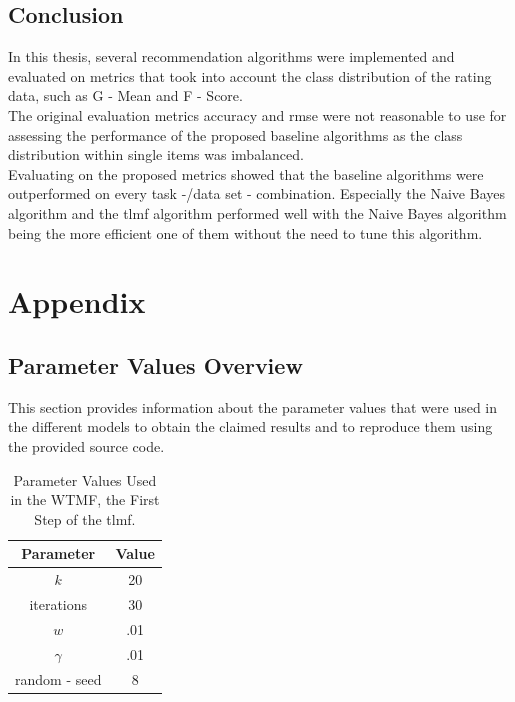 \subsection{Conclusion}
In this thesis, several recommendation algorithms were implemented and evaluated on metrics that took into account the class distribution of the rating data, such as G - Mean and F - Score.\\
The original evaluation metrics accuracy and rmse were not reasonable to use for assessing the performance of the proposed baseline algorithms as the class distribution within single items was imbalanced.\\
Evaluating on the proposed metrics showed that the baseline algorithms were outperformed on every task -/data set - combination. Especially the Naive Bayes algorithm and the \acrshort{tlmf} algorithm performed well with the Naive Bayes algorithm being the more efficient one of them without the need to tune this algorithm.
 
\clearpage
\section{Appendix}
\subsection{Parameter Values Overview}
\label{chap:pvo}
This section provides information about the parameter values that were used in the different models to obtain the claimed results and to reproduce them using the provided source code.

\begin{table}[h!]
    \centering
    \begin{tabular}{|c|c|}
        \hline Parameter & Value \\
        \hline  $k$ & 20 \\
        iterations & 30 \\
        $w$ & .01 \\
        $\gamma$ & .01 \\
        random - seed & 8 \\
    \hline    
    \end{tabular}
    \caption{Parameter Values Used in the WTMF, the First Step of the \acrshort{tlmf}.}
    \label{tab:wtmf}
\end{table}

